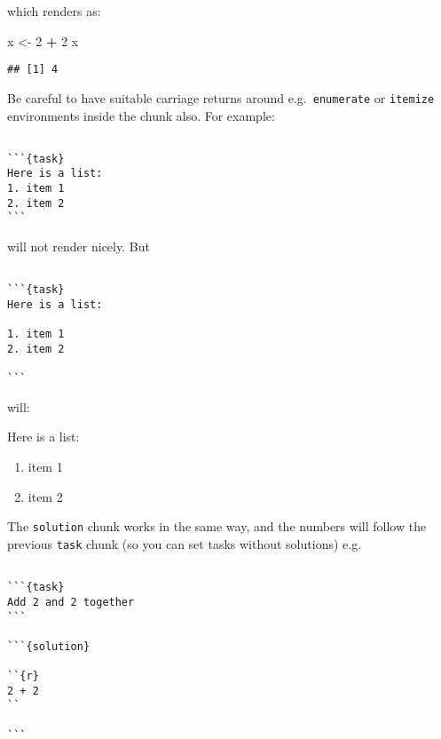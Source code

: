\documentclass[]{book}
\newenvironment{Shaded}{\begin{snugshade}}{\end{snugshade}}
\newcommand{\DecValTok}[1]{\textcolor[rgb]{0.00,0.00,0.81}{#1}}
\newcommand{\NormalTok}[1]{#1}
\newcommand{\OperatorTok}[1]{\textcolor[rgb]{0.81,0.36,0.00}{\textbf{#1}}}
\newcommand{\StringTok}[1]{\textcolor[rgb]{0.31,0.60,0.02}{#1}}
\providecommand{\tightlist}{%
  \setlength{\itemsep}{0pt}\setlength{\parskip}{0pt}}
\newcommand{\bblockT}[2][Task]{\begin{tcolorbox}[title = #1 #2, parbox = false]}
\newcommand{\eblockT}{\end{tcolorbox}}
\begin{document}
which renders as:

\hypertarget{tsk2}{}\bblockT[Task]{\phantomsection\label{sol2}2}

\begin{Shaded}
\begin{Highlighting}[]
\NormalTok{x <-}\StringTok{ }\DecValTok{2} \OperatorTok{+}\StringTok{ }\DecValTok{2}
\NormalTok{x}
\end{Highlighting}
\end{Shaded}

\begin{verbatim}
## [1] 4
\end{verbatim}

\eblockT

Be careful to have suitable carriage returns around e.g.~\texttt{enumerate} or \texttt{itemize} environments inside the chunk also. For example:

\begin{verbatim}

```{task}
Here is a list:
1. item 1
2. item 2
```
\end{verbatim}

will not render nicely. But

\begin{verbatim}

```{task}
Here is a list:

1. item 1
2. item 2

```
\end{verbatim}

will:

\hypertarget{tsk3}{}\bblockT[Task]{\phantomsection\label{sol3}3}

Here is a list:

\begin{enumerate}
\def\labelenumi{\arabic{enumi}.}
\tightlist
\item
  item 1
\item
  item 2
\end{enumerate}

\eblockT

The \texttt{solution} chunk works in the same way, and the numbers will follow the previous \texttt{task} chunk (so you can set tasks without solutions) e.g.

\begin{verbatim}

```{task}
Add 2 and 2 together
```

```{solution}

``{r}
2 + 2
``

```
\end{verbatim}
\end{document}
